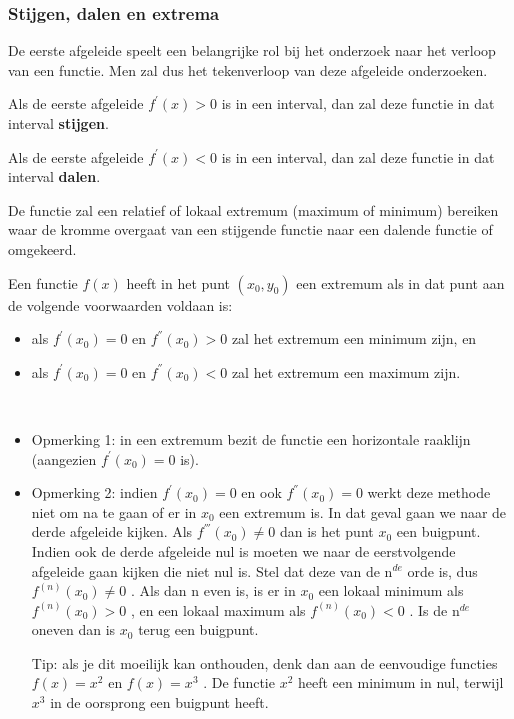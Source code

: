 \subsubsection{Stijgen, dalen en extrema}

De eerste afgeleide speelt een belangrijke rol bij het onderzoek
naar het verloop van een functie. Men zal dus het tekenverloop van
deze afgeleide onderzoeken.




\begin{definitie}
	Als de eerste afgeleide $f^{'}(x)>0$ is in een interval,
dan zal deze functie in dat interval \textbf{stijgen}.

Als de eerste afgeleide $f^{'}(x)<0$ is in een interval,
dan zal deze functie in dat interval \textbf{dalen}.

De functie zal een relatief of lokaal extremum (maximum
of minimum) bereiken waar de kromme overgaat van een stijgende functie
naar een dalende functie of omgekeerd.

Een functie $f(x)$ heeft in het punt $(x_{0},y_{0})$ een
extremum als in dat punt aan de volgende voorwaarden voldaan is:

\begin{itemize}
\item als $f^{'}(x_{0})=0$ en $f^{''}(x_{0})>0$ zal het
extremum een minimum zijn, en
\item als $f^{'}(x_{0})=0$ en $f^{''}(x_{0})<0$ zal het
extremum een maximum zijn.
\end{itemize}

\end{definitie}

\begin{opmerking}
	\ \\
	\begin{itemize}
\item Opmerking 1: in een extremum bezit de functie een horizontale
raaklijn (aangezien $f^{'}(x_{0})=0$ is).
\item Opmerking 2: indien $f^{'}(x_{0})=0$ en ook $f^{''}(x_{0})=0$
werkt deze methode niet om na te gaan of er in $x_{0}$ een extremum
is. In dat geval gaan we naar de derde afgeleide kijken. Als $f^{'''}(x_{0})\neq0$
dan is het punt $x_{0}$ een buigpunt. Indien ook de derde afgeleide
nul is moeten we naar de eerstvolgende afgeleide gaan kijken die niet
nul is. Stel dat deze van de n$^{de}$ orde is, dus $f^{(n)}(x_{0})\neq0$
. Als dan n even is, is er in $x_{0}$ een lokaal minimum als $f^{(n)}(x_{0})>0$
, en een lokaal maximum als $f^{(n)}(x_{0})<0$ . Is de n$^{de}$
oneven dan is $x_{0}$ terug een buigpunt. 

Tip: als je dit moeilijk
kan onthouden, denk dan aan de eenvoudige functies $f(x)=x^{2}$ en
$f(x)=x^{3}$ . De functie $x^{2}$ heeft een minimum in nul, terwijl
$x^{3}$ in de oorsprong een buigpunt heeft.
\end{itemize}

\end{opmerking}



